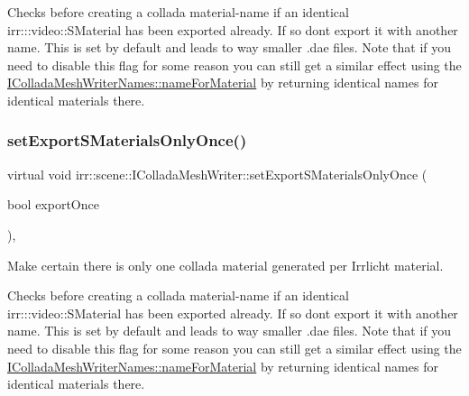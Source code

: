 Checks before creating a collada material-\/name if an identical irr\+:\+::video\+::\+S\+Material has been exported already. If so don\textquotesingle{}t export it with another name. This is set by default and leads to way smaller .dae files. Note that if you need to disable this flag for some reason you can still get a similar effect using the \hyperlink{classirr_1_1scene_1_1IColladaMeshWriterNames_acb5c8f38769d3fedcc76df73d9350c07}{I\+Collada\+Mesh\+Writer\+Names\+::name\+For\+Material} by returning identical names for identical materials there. \mbox{\label{classirr_1_1scene_1_1IColladaMeshWriter_af6f37ca4a1ef6238cc079f3f5d5eb612}} 
\subsubsection{\texorpdfstring{set\+Export\+S\+Materials\+Only\+Once()}{setExportSMaterialsOnlyOnce()}\hspace{0.1cm}{\footnotesize\ttfamily [2/2]}}
{\footnotesize\ttfamily virtual void irr\+::scene\+::\+I\+Collada\+Mesh\+Writer\+::set\+Export\+S\+Materials\+Only\+Once (\begin{DoxyParamCaption}\item[{bool}]{export\+Once }\end{DoxyParamCaption})\hspace{0.3cm}{\ttfamily [inline]}, {\ttfamily [virtual]}}



Make certain there is only one collada material generated per Irrlicht material. 

Checks before creating a collada material-\/name if an identical irr\+:\+::video\+::\+S\+Material has been exported already. If so don\textquotesingle{}t export it with another name. This is set by default and leads to way smaller .dae files. Note that if you need to disable this flag for some reason you can still get a similar effect using the \hyperlink{classirr_1_1scene_1_1IColladaMeshWriterNames_acb5c8f38769d3fedcc76df73d9350c07}{I\+Collada\+Mesh\+Writer\+Names\+::name\+For\+Material} by returning identical names for identical materials there. \mbox{\label{classirr_1_1scene_1_1IColladaMeshWriter_a25d2e1ff0bf04375c822800b0b3a4b01}} 
